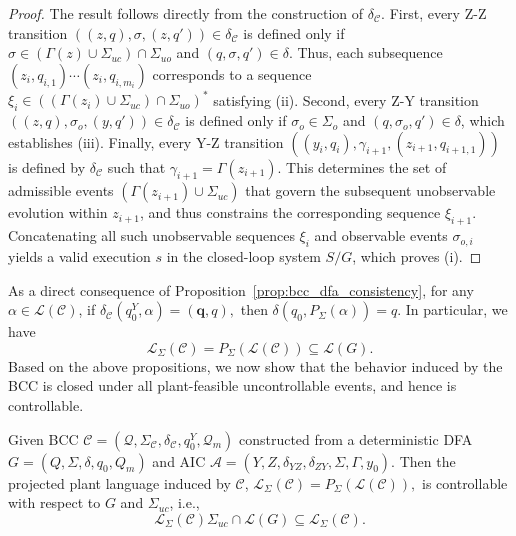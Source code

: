 \documentclass[journal,twoside,web]{ieeecolor}
\begin{document}
%
\begin{proof}
The result follows directly from the construction of $\delta_{\mathcal{C}}$.
%
First, every Z-Z transition $((z, q), \sigma, (z, q')) \in \delta_{\mathcal{C}}$ is defined only if $\sigma \in (\Gamma(z) \cup \Sigma_{uc}) \cap \Sigma_{uo}$ and $(q, \sigma, q') \in \delta$. 
Thus, each subsequence $(z_i, q_{i,1}) \cdots (z_i, q_{i,m_i})$ corresponds to a sequence $\xi_i \in ((\Gamma(z_i) \cup \Sigma_{uc}) \cap \Sigma_{uo})^*$ satisfying (ii).
%
Second, every Z-Y transition $((z, q), \sigma_o, (y, q')) \in \delta_{\mathcal{C}}$ is defined only if $\sigma_o \in \Sigma_o$ and $(q, \sigma_o, q') \in \delta$, which establishes (iii).
%
Finally, every Y-Z transition $((y_i, q_i), \gamma_{i+1}, (z_{i+1}, q_{i+1,1}))$ is defined by $\delta_\mathcal{C}$ such that $\gamma_{i+1} = \Gamma(z_{i+1})$.
This determines the set of admissible events $(\Gamma(z_{i+1}) \cup \Sigma_{uc})$ that govern the subsequent unobservable evolution within $z_{i+1}$, and thus constrains the corresponding sequence $\xi_{i+1}$.
Concatenating all such unobservable sequences $\xi_i$ and observable events $\sigma_{o,i}$ yields a valid execution $s$ in the closed-loop system $S/G$, which proves (i).
\end{proof}
%
As a direct consequence of Proposition~\ref{prop:bcc_dfa_consistency}, 
for any $\alpha \in \mathcal{L}(\mathcal{C})$, if
$
\delta_{\mathcal{C}}(q^Y_0,\alpha)=(\bm{q},q),
$
then
$
    \delta(q_0,P_\Sigma(\alpha)) = q.
$
In particular, we have
$$
    \mathcal{L}_{\Sigma}(\mathcal{C})
    =
    P_\Sigma(\mathcal{L}(\mathcal{C}))
    \subseteq
    \mathcal{L}(G).
$$
Based on the above propositions, we now show that the behavior induced by the BCC is closed under all plant-feasible uncontrollable events, and hence is controllable.
%
\begin{theorem}\label{theo:ctrl_bcc}
Given BCC 
$\mathcal{C} = (\bm{\mathcal{Q}}, \Sigma_{\mathcal{C}}, \delta_{\mathcal{C}}, q^Y_0, \bm{\mathcal{Q}}_m)$
constructed from a deterministic DFA
$G=(Q,\Sigma,\delta,q_0,Q_m)$
and AIC
$\mathcal{A}=(Y,Z,\delta_{YZ},\delta_{ZY},\Sigma,\Gamma,y_0)$.
%
Then the projected plant language induced by $\mathcal{C}$,
$
    \mathcal{L}_{\Sigma}(\mathcal{C}) = P_\Sigma(\mathcal{L}(\mathcal{C})),
$
is controllable with respect to $G$ and $\Sigma_{uc}$, i.e.,
\begin{equation}
    \mathcal{L}_{\Sigma}(\mathcal{C})\Sigma_{uc} \cap \mathcal{L}(G)\subseteq \mathcal{L}_{\Sigma}(\mathcal{C}).
    \label{eq:bcc_controllability}
\end{equation}
\end{theorem}
\end{document}
